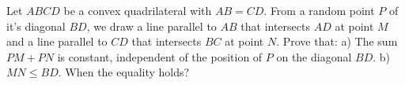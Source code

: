 Let $ABCD$ be a convex quadrilateral with $AB=CD$. From a random  point $P$ of it's diagonal $BD$, we draw a line parallel to $AB$ that intersects $AD$ at point $M$ and a line parallel to $CD$ that intersects $BC$ at point $N$. Prove that:
a) The sum $PM+PN$ is constant, independent of the position of $P$ on the diagonal $BD$.
b) $MN\le BD$. When the equality holds?